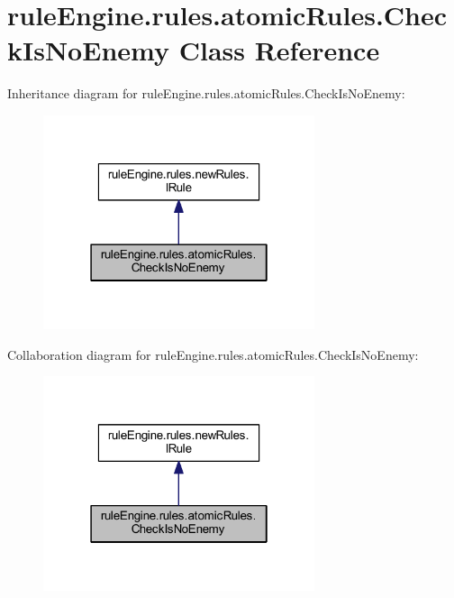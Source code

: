 \hypertarget{classrule_engine_1_1rules_1_1atomic_rules_1_1_check_is_no_enemy}{}\section{rule\+Engine.\+rules.\+atomic\+Rules.\+Check\+Is\+No\+Enemy Class Reference}
\label{classrule_engine_1_1rules_1_1atomic_rules_1_1_check_is_no_enemy}


Inheritance diagram for rule\+Engine.\+rules.\+atomic\+Rules.\+Check\+Is\+No\+Enemy\+:
\nopagebreak
\begin{figure}[H]
\begin{center}
\leavevmode
\includegraphics[width=226pt]{classrule_engine_1_1rules_1_1atomic_rules_1_1_check_is_no_enemy__inherit__graph}
\end{center}
\end{figure}


Collaboration diagram for rule\+Engine.\+rules.\+atomic\+Rules.\+Check\+Is\+No\+Enemy\+:
\nopagebreak
\begin{figure}[H]
\begin{center}
\leavevmode
\includegraphics[width=226pt]{classrule_engine_1_1rules_1_1atomic_rules_1_1_check_is_no_enemy__coll__graph}
\end{center}
\end{figure}
